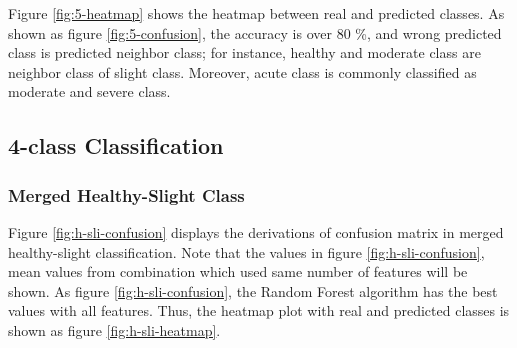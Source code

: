 \documentclass[11pt, a4paper]{article}
\begin{document}
    		Figure \ref{fig:5-heatmap} shows the heatmap between real and predicted classes. As shown as figure \ref{fig:5-confusion}, the accuracy is over 80 \%, and wrong predicted class is predicted neighbor class; for instance, healthy and moderate class are neighbor class of slight class. Moreover, acute class is commonly classified as moderate and severe class. 
    		
    	\subsection{4-class Classification}
    		\subsubsection{Merged Healthy-Slight Class}
    			Figure \ref{fig:h-sli-confusion} displays the derivations of confusion matrix in merged healthy-slight classification. Note that the values in figure \ref{fig:h-sli-confusion}, mean values from combination which used same number of features will be shown. As figure \ref{fig:h-sli-confusion}, the Random Forest algorithm has the best values with all features. Thus, the heatmap plot with real and predicted classes is shown as figure \ref{fig:h-sli-heatmap}.
    			
\end{document}
